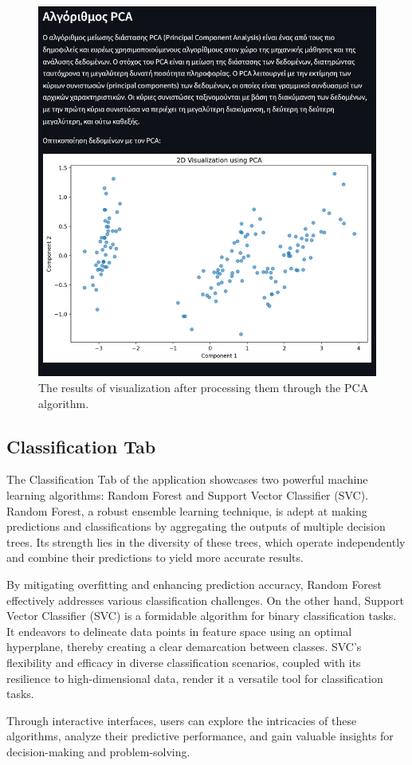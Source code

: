 \documentclass[unnumsec,webpdf,contemporary,large]{oup-authoring-template}%
\theoremstyle{thmstyleone}%
\theoremstyle{thmstyletwo}%
\theoremstyle{thmstylethree}%
\begin{document}
\begin{figure}
    \centering
    \includegraphics[width=0.4\linewidth]{pca.png}
    \caption{The results of visualization after processing them through the PCA algorithm.}
    \label{fig:pca}
\end{figure}

\subsection{\textbf{Classification Tab}}
\vspace{0.2cm}


The Classification Tab of the application showcases two powerful machine learning algorithms: Random Forest and Support Vector Classifier (SVC). Random Forest, a robust ensemble learning technique, is adept at making predictions and classifications by aggregating the outputs of multiple decision trees. Its strength lies in the diversity of these trees, which operate independently and combine their predictions to yield more accurate results. 
\vspace{0.2cm}

By mitigating overfitting and enhancing prediction accuracy, Random Forest effectively addresses various classification challenges. On the other hand, Support Vector Classifier (SVC) is a formidable algorithm for binary classification tasks. It endeavors to delineate data points in feature space using an optimal hyperplane, thereby creating a clear demarcation between classes. SVC's flexibility and efficacy in diverse classification scenarios, coupled with its resilience to high-dimensional data, render it a versatile tool for classification tasks. 
\vspace{0.2cm}

Through interactive interfaces, users can explore the intricacies of these algorithms, analyze their predictive performance, and gain valuable insights for decision-making and problem-solving.
\vspace{0.2cm}
\end{document}
